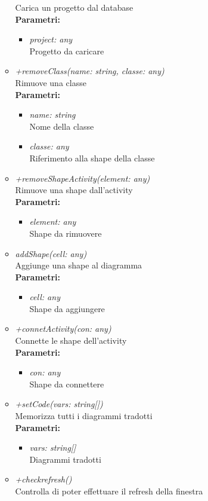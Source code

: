 \begin{itemize}
\begin{itemize}
    		Carica un progetto dal database\\
    		\textbf{Parametri:}
    		\begin{itemize}
    			\item \emph{project: any}\\
    			Progetto da caricare
    		\end{itemize}
    		\item \emph{+removeClass(name: string, classe: any)}\\
    		Rimuove una classe\\
    		\textbf{Parametri:}
    		\begin{itemize}
    			\item \emph{name: string}\\
    			Nome della classe
    			\item \emph{classe: any}\\
    			Riferimento alla shape della classe
    		\end{itemize}
    		\item \emph{+removeShapeActivity(element: any)}\\
    		Rimuove una shape dall'activity\\
    		\textbf{Parametri:}
    		\begin{itemize}
    			\item \emph{element: any}\\
    			Shape da rimuovere
    		\end{itemize}
    		\item \emph{addShape(cell: any)}\\
    		Aggiunge una shape al diagramma\\
    		\textbf{Parametri:}
    		\begin{itemize}
    			\item \emph{cell: any}\\
    			Shape da aggiungere
    		\end{itemize}
    		\item \emph{+connetActivity(con: any)}\\
    		Connette le shape dell'activity\\
    		\textbf{Parametri:}
    		\begin{itemize}
    			\item \emph{con: any}\\
    			Shape da connettere
    		\end{itemize}
    		\item \emph{+setCode(vars: string[])}\\
    		Memorizza tutti i diagrammi tradotti\\
    		\textbf{Parametri:}
    		\begin{itemize}
    			\item \emph{vars: string[]}\\
    			Diagrammi tradotti
    		\end{itemize}
    		\item \emph{+checkrefresh()}\\
    		Controlla di poter effettuare il refresh della finestra
		\end{itemize}
\end{itemize}